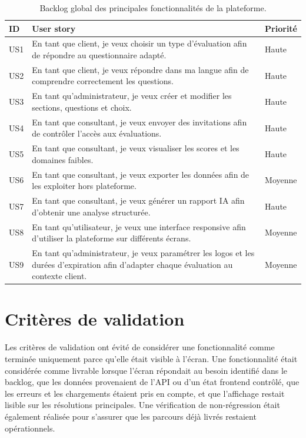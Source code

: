 \documentclass[12pt,a4paper]{report}
\begin{document}
\begin{longtable}{L{1.5cm}L{8cm}L{3cm}}
\caption{Backlog global des principales fonctionnalités de la plateforme.}\\
\toprule
ID & User story & Priorité \\
\midrule
US1 & En tant que client, je veux choisir un type d'évaluation afin de répondre au questionnaire adapté. & Haute \\
US2 & En tant que client, je veux répondre dans ma langue afin de comprendre correctement les questions. & Haute \\
US3 & En tant qu'administrateur, je veux créer et modifier les sections, questions et choix. & Haute \\
US4 & En tant que consultant, je veux envoyer des invitations afin de contrôler l'accès aux évaluations. & Haute \\
US5 & En tant que consultant, je veux visualiser les scores et les domaines faibles. & Haute \\
US6 & En tant que consultant, je veux exporter les données afin de les exploiter hors plateforme. & Moyenne \\
US7 & En tant que consultant, je veux générer un rapport IA afin d'obtenir une analyse structurée. & Haute \\
US8 & En tant qu'utilisateur, je veux une interface responsive afin d'utiliser la plateforme sur différents écrans. & Moyenne \\
US9 & En tant qu'administrateur, je veux paramétrer les logos et les durées d'expiration afin d'adapter chaque évaluation au contexte client. & Moyenne \\
\bottomrule
\end{longtable}

\section{Critères de validation}
Les critères de validation ont évité de considérer une fonctionnalité comme terminée uniquement parce qu'elle était visible à l'écran. Une fonctionnalité était considérée comme livrable lorsque l'écran répondait au besoin identifié dans le backlog, que les données provenaient de l'API ou d'un état frontend contrôlé, que les erreurs et les chargements étaient pris en compte, et que l'affichage restait lisible sur les résolutions principales. Une vérification de non-régression était également réalisée pour s'assurer que les parcours déjà livrés restaient opérationnels.
\end{document}
